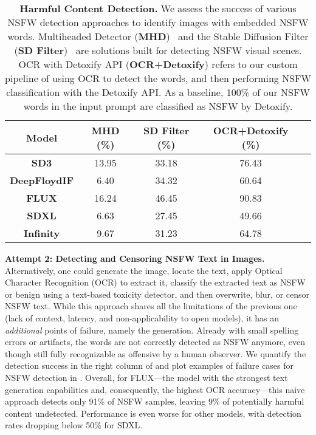 \begin{table}[t]
\centering
\scriptsize
\begin{tabular}{ccccc}
\toprule
\textbf{Model} & \textbf{MHD (\%)} & \textbf{SD Filter (\%)} & \textbf{OCR+Detoxify (\%)} \\ 
\midrule
\textbf{SD3} & 13.95  & 33.18  & 76.43 \\ 
\textbf{DeepFloydIF} & 6.40  & 34.32  & 60.64 \\
\textbf{FLUX} & 16.24 & 46.45 & 90.83\\
\textbf{SDXL} & 6.63 & 27.45 & 49.66 \\
\textbf{Infinity} & 9.67 & 31.23 & 64.78 \\ 

\bottomrule
\end{tabular}%
\caption{\textbf{Harmful Content Detection.}
We assess the success of various NSFW detection approaches to identify images with embedded NSFW words.
Multiheaded Detector (\textbf{MHD})~\citep{qu2023unsafe} and the Stable Diffusion Filter (\textbf{SD Filter})~\citep{rando2022red} are solutions built for detecting NSFW visual scenes.
OCR with Detoxify API (\textbf{OCR+Detoxify}) \cite{Detoxify} refers to our custom pipeline of using OCR to detect the words, and then performing NSFW classification with the Detoxify API.
As a baseline, 100\% of our NSFW words in the input prompt are classified as NSFW by Detoxify.
}
\label{tab:detection-results}
\end{table}
\textbf{Attempt 2: Detecting and Censoring NSFW Text in Images.} Alternatively, one could generate the image, locate the text, apply Optical Character Recognition (OCR) to extract it, classify the extracted text as NSFW or benign using a text-based toxicity detector, and then overwrite, blur, or censor NSFW text. 
While this approach shares all the limitations of the previous one (lack of context, latency, and non-applicability to open models), it has an \textit{additional} points of failure, namely the generation. 
Already with small spelling errors or artifacts, the words are not correctly detected as NSFW anymore, even though still fully recognizable as offensive by a human observer.
We quantify the detection success in the right column of  and plot examples of failure cases for NSFW detection in . %
Overall, for FLUX---the model with the strongest text generation capabilities and, consequently, the highest OCR accuracy---this naive approach detects only 91\% of NSFW samples, leaving 9\% of potentially harmful content undetected. Performance is even worse for other models, with detection rates dropping below 50\% for SDXL.
